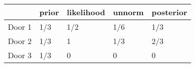 \begin{tabular}{lllll}
\toprule
{} & prior & likelihood & unnorm & posterior \\
\midrule
Door 1 &   1/3 &        1/2 &    1/6 &       1/3 \\
Door 2 &   1/3 &          1 &    1/3 &       2/3 \\
Door 3 &   1/3 &          0 &      0 &         0 \\
\bottomrule
\end{tabular}
